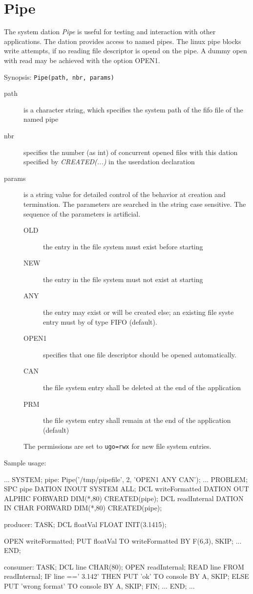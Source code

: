 \section{Pipe}
The system dation {\em Pipe} is useful for testing and interaction with
other applications. The dation provides access to named pipes.
The linux pipe blocks write attempts, if no reading file descriptor
is opend on the pipe. 
A dummy open with read may be achieved with the option OPEN1.

Synopsis: \verb|Pipe(path, nbr, params)|

\begin{description}
\item [path] is a character string,
     which specifies the system path of the fifo file
    of the named pipe
\item[nbr] specifies the number (as int) of concurrent opened files with this dation
     specified by {\em CREATED(...)} in the userdation declaration
\item [params] is a string value for detailed control of the behavior
     at creation and termination. The parameters are searched in the string
     case sensitive. The sequence of the parameters is artificial.
   \begin{description}
     \item[OLD] the entry in the file system must exist before starting
     \item[NEW] the entry in the file system must not exist at starting
     \item[ANY] the entry may exist or will be created else; an existing
                file syste entry must by of type FIFO (default).
     \item[OPEN1] specifies that one file descriptor should be opened 
                automatically.
     \item[CAN] the file system entry shall be deleted at the end of the 
                application
     \item[PRM] the file system entry shall remain at the end of the
                application (default)
   \end{description} 
   The permissions are set to \verb|ugo=rwx| for new file system entries.
\end{description}

Sample usage:
\begin{PEARLCode}
...
SYSTEM;
   pipe: Pipe('/tmp/pipefile', 2, 'OPEN1 ANY CAN');
...
PROBLEM;
   SPC pipe DATION INOUT SYSTEM ALL;
   DCL writeFormatted DATION OUT ALPHIC FORWARD DIM(*,80) CREATED(pipe);
   DCL readInternal   DATION IN  CHAR   FORWARD DIM(*,80) CREATED(pipe);

producer: TASK;
   DCL floatVal FLOAT INIT(3.1415);

   OPEN writeFormatted;
   PUT  floatVal TO writeFormatted BY F(6,3), SKIP;
...
END;

consumer: TASK;
   DCL line CHAR(80);
   OPEN readInternal;
   READ line FROM readInternal;
   IF line ==' 3.142' THEN
      PUT 'ok' TO console BY A, SKIP;
   ELSE
      PUT 'wrong format' TO console BY A, SKIP;
   FIN;
...
END;
...
\end{PEARLCode}

